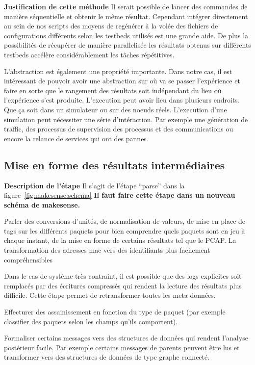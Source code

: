 \inputminted{python}{snippets/fabric.py}

\textbf{Justification de cette méthode} Il serait possible de lancer des
commandes de manière séquentielle et obtenir le même résultat. Cependant
intégrer directement au sein de nos scripts des moyens de regénérer à la volée
des fichiers de configurations différents selon les testbeds utilisés est une
grande aide. De plus la possibilités de récupérer de manière parallelisée les
résultats obtenus sur différents testbeds accélère considérablement les tâches
répétitives.

L'abstraction est également une propriété importante. Dans notre cas, il est
intéressant de pouvoir avoir une abstraction sur où va se passer l'expérience
et faire en sorte que le rangement des résultats soit indépendant du lieu où
l'expérience s'est produite. L'execution peut avoir lieu dans plusieurs
endroits. Que ça soit dans un simulateur ou sur des noeuds réels. L'execution
d'une simulation peut nécessiter une série d'intéraction. Par exemple une
génération de traffic, des processus de supervision des processus et des
communications ou encore la relance de services qui ont des pannes.

\subsection{Mise en forme des résultats intermédiaires}

\textbf{Description de l'étape}  Il s'agit de  l'étape ``parse''  dans la
figure~\ref{fig:makesense:schema}  \textbf{Il faut faire cette étape dans un
nouveau schéma de makesense.}

Parler des conversions d'unités, de normalisation de valeurs, de mise en place
de tags sur les différents paquets pour bien comprendre quels paquets sont en
jeu à chaque instant, de la mise en forme de certains résultats tel que le
PCAP. La transformation des adresses mac vers des identifiants plus facilement
compréhensibles

Dans le cas de système très contraint, il est possible que des logs explicites
soit remplacés par des écritures compressés qui rendent la lecture des
résultats plus difficile. Cette étape permet de retransformer toutes les meta
données.

Effecturer des assainissement en fonction du type de paquet (par exemple
classifier des paquets selon les champs qu'ils comportent).

Formaliser certains messages vers des structures de données qui rendent
l'analyse postérieur facile. Par exemple certains messages de parents peuvent
être lus et transformer vers des structures de données de type graphe
connecté.

